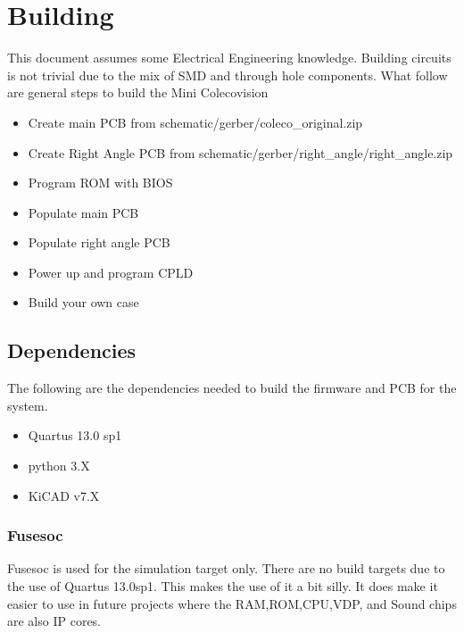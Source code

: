 \section{Building}

\par
This document assumes some Electrical Engineering knowledge. Building circuits is not
trivial due to the mix of SMD and through hole components. What follow are general
steps to build the Mini Colecovision

\begin{itemize}
  \item Create main PCB from schematic/gerber/coleco\_original.zip
  \item Create Right Angle PCB from schematic/gerber/right\_angle/right\_angle.zip
  \item Program ROM with BIOS
  \item Populate main PCB
  \item Populate right angle PCB
  \item Power up and program CPLD
  \item Build your own case
\end{itemize}

\subsection{Dependencies}

\par
The following are the dependencies needed to build the firmware and PCB for the system.

\begin{itemize}
  \item Quartus 13.0 sp1
  \item python 3.X
  \item KiCAD v7.X
\end{itemize}



\subsubsection{Fusesoc}
\par
Fusesoc is used for the simulation target only. There are no build targets due to the use of Quartus 13.0sp1.
This makes the use of it a bit silly. It does make it easier to use in future projects where the RAM,ROM,CPU,VDP,
and Sound chips are also IP cores.




